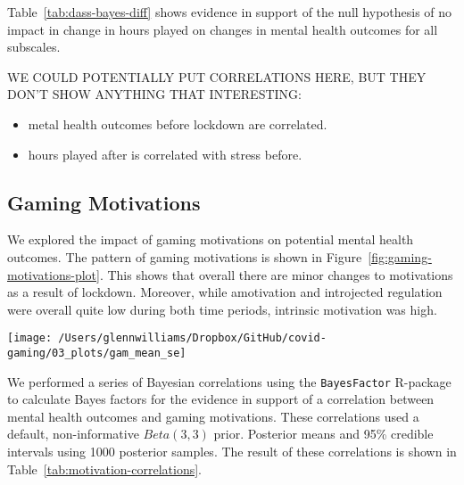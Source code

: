 \documentclass[
  english,
  jou,floatsintext]{apa6}
\providecommand{\tightlist}{%
  \setlength{\itemsep}{0pt}\setlength{\parskip}{0pt}}
\begin{document}
Table~\ref{tab:dass-bayes-diff} shows evidence in support of the null hypothesis of no impact in change in hours played on changes in mental health outcomes for all subscales.

WE COULD POTENTIALLY PUT CORRELATIONS HERE, BUT THEY DON'T SHOW ANYTHING THAT INTERESTING:

\begin{itemize}
\tightlist
\item
  metal health outcomes before lockdown are correlated.
\item
  hours played after is correlated with stress before.
\end{itemize}

\hypertarget{gaming-motivations}{%
\subsection{Gaming Motivations}\label{gaming-motivations}}

We explored the impact of gaming motivations on potential mental health outcomes. The pattern of gaming motivations is shown in Figure~\ref{fig:gaming-motivations-plot}. This shows that overall there are minor changes to motivations as a result of lockdown. Moreover, while amotivation and introjected regulation were overall quite low during both time periods, intrinsic motivation was high.

\begin{figure*}[!htbp]

{\centering \texttt{[image: /Users/glennwilliams/Dropbox/GitHub/covid-gaming/03\_plots/gam\_mean\_se]} 

}

\caption{ }\label{fig:gaming-motivations-plot}
\end{figure*}

We performed a series of Bayesian correlations using the \texttt{BayesFactor} R-package to calculate Bayes factors for the evidence in support of a correlation between mental health outcomes and gaming motivations. These correlations used a default, non-informative \(Beta(3, 3)\) prior. Posterior means and 95\% credible intervals using 1000 posterior samples. The result of these correlations is shown in Table~\ref{tab:motivation-correlations}.
\end{document}
